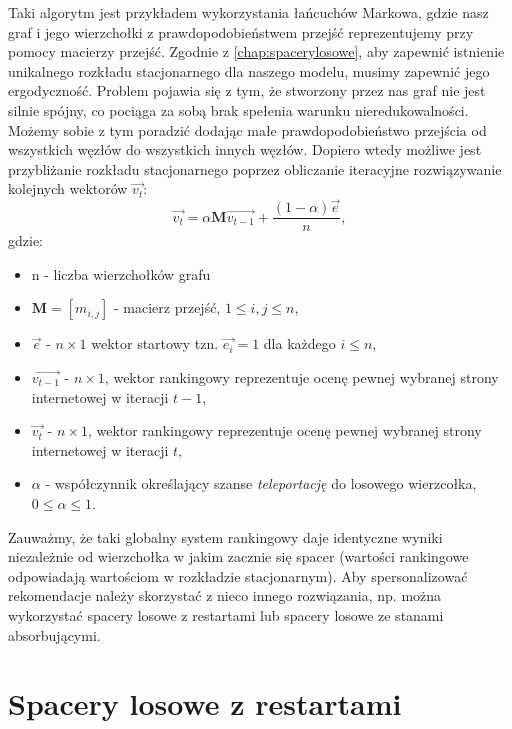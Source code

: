Taki algorytm jest przykładem wykorzystania łańcuchów Markowa, gdzie nasz graf i jego wierzchołki z prawdopodobieństwem przejść reprezentujemy przy pomocy macierzy przejść. Zgodnie z \ref{chap:spacerylosowe}, aby zapewnić istnienie unikalnego rozkładu stacjonarnego dla naszego modelu, musimy zapewnić jego ergodyczność. Problem pojawia się z tym, że stworzony przez nas graf nie jest silnie spójny, co pociąga za sobą brak spełenia warunku nieredukowalności. Możemy sobie z tym poradzić dodając małe prawdopodobieństwo przejścia od wszystkich węzłów do wszystkich innych węzłów. Dopiero wtedy możliwe jest przybliżanie rozkładu stacjonarnego poprzez obliczanie iteracyjne rozwiązywanie kolejnych wektorów $ \overrightarrow{v_{t}}$:
\begin{equation}
\label{pagerank}
   \overrightarrow{v_{t}} = \alpha \textbf{M}\overrightarrow{v_{t-1}} + \frac{(1 - \alpha) \overrightarrow{e}}{n},
\end{equation}
gdzie:
\begin{itemize}
    \item n - liczba wierzchołków grafu
    \item $\bm{M}=[m_{i,j}] $  - macierz przejść, $1 \leq i, j \leq n$,
    \item $\overrightarrow{e}$ - $n \times 1$ wektor startowy tzn. $\overrightarrow{e_{i}}=1$ dla każdego $i \leq n$,
    \item $ \overrightarrow{v_{t-1}}$ - $n \times 1$, wektor rankingowy  reprezentuje ocenę pewnej wybranej strony internetowej w iteracji $t-1$,
    \item $ \overrightarrow{v_{t}}$ - $n \times 1$, wektor rankingowy reprezentuje ocenę pewnej wybranej strony internetowej w iteracji $t$,
    \item $\alpha$ - współczynnik określający szanse \textit{teleportację} do losowego wierzcołka, $0 \leq \alpha \leq 1$.
\end{itemize}


Zauważmy, że taki globalny system rankingowy daje identyczne wyniki niezależnie od wierzchołka w jakim zacznie się spacer (wartości rankingowe odpowiadają wartościom w rozkładzie stacjonarnym). Aby spersonalizować rekomendacje należy skorzystać z nieco innego rozwiązania, np. można wykorzystać spacery losowe z restartami lub spacery losowe ze stanami absorbującymi.
 
\section{Spacery losowe z restartami}
\label{chap:spacerlosowezrestartami}


